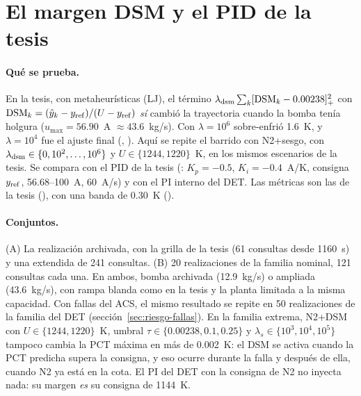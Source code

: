 \section{El margen DSM y el PID de la tesis}\label{sec:dsm-lambda}
\paragraph{Qué se prueba.} En la tesis, con metaheurísticas (LJ), el término
$\lambda_{\rm dsm}\sum_k[\mathrm{DSM}_k-0.00238]_+^2$ con
$\mathrm{DSM}_k=(\hat y_k-y_{\rm ref})/(U-y_{\rm ref})$ \emph{sí} cambió la trayectoria cuando la
bomba tenía holgura ($u_{\max}=56.90$~A $\approx43.6$~kg/s). Con $\lambda=10^6$ sobre-enfrió
1.6~K, y $\lambda=10^4$ fue el ajuste final (,
). Aquí se repite el barrido con N2+sesgo, con
$\lambda_{\rm dsm}\in\{0,10^2,\dots,10^6\}$ y $U\in\{1244,1220\}$~K, en los mismos escenarios
de la tesis. Se compara con el PID de la tesis (: $K_p=-0.5$,
$K_i=-0.4$~A/K, consigna $y_{\rm ref}$, 56.68--100~A, 60~A/s) y con el PI interno del DET. Las
métricas son las de la tesis (), con una banda de 0.30~K
().

\paragraph{Conjuntos.} (A) La realización archivada, con la grilla de la tesis (61 consultas
desde 1160~s) y una extendida de 241 consultas. (B) 20 realizaciones de la familia nominal,
121 consultas cada una. En ambos, bomba archivada (12.9~kg/s) o ampliada (43.6~kg/s), con
rampa blanda como en la tesis y la planta limitada a la misma capacidad. Con fallas del ACS, el
mismo resultado se repite en 50 realizaciones de la familia del DET
(sección~\ref{sec:riesgo-fallas}). En la familia extrema, N2+DSM con
$U\in\{1244,1220\}$~K, umbral $\tau\in\{0.00238, 0.1, 0.25\}$ y
$\lambda_s\in\{10^3,10^4,10^5\}$ tampoco cambia la PCT máxima en más de 0.002~K: el DSM se
activa cuando la PCT predicha supera la consigna, y eso ocurre durante la falla y después de
ella, cuando N2 ya está en la cota. El PI del DET con la consigna de N2 no inyecta nada: su
margen \emph{es} su consigna de 1144~K.



